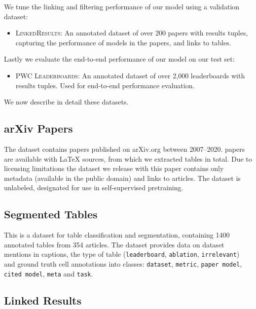 \documentclass[11pt,a4paper]{article}
\newcommand{\leaderboards}{\textsc{PWC Leaderboards}}
\newcommand{\linkedresults}{\textsc{LinkedResults}}
\newcommand{\arxiv}{arXiv.org}
\begin{document}
We tune the linking and filtering performance of our model using a validation dataset:

\begin{itemize}
  \item \linkedresults{}: An annotated dataset of over 200 papers with results tuples, capturing the performance of models in the papers, and links to tables.
 \end{itemize}

Lastly we evaluate the end-to-end performance of our model on our test set:

\begin{itemize}
  \item \leaderboards{}: An annotated dataset of over 2,000 leaderboards with results tuples. Used for end-to-end performance evaluation.
\end{itemize}

We now describe in detail these datasets.

\subsection{arXiv Papers}
\label{sec:dataset:unlabeled}


The dataset contains  papers published on \arxiv{} between 2007--2020.  papers are available with \LaTeX{} sources, from which we extracted  tables in total. 
Due to licensing limitations the dataset we release with this paper contains only metadata (available in the public domain) and links to articles. The dataset is unlabeled, designated for use in self-supervised pretraining.


\subsection{Segmented Tables}
\label{sec:dataset:structure}

This is a dataset for table classification and segmentation, containing 1400 annotated tables from 354 articles. The dataset provides data on dataset mentions in captions, the type of table (\texttt{leaderboard}, \texttt{ablation}, \texttt{irrelevant}) and ground truth cell annotations into classes: \texttt{dataset}, \texttt{metric}, \texttt{paper model}, \texttt{cited model}, \texttt{meta} and \texttt{task}.

\subsection{Linked Results}
\label{sec:dataset:results}
\end{document}
